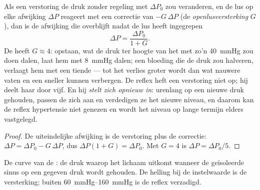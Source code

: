 \begin{theorem}\label{thm:b2:blood-pressure:gain}
Als een verstoring de druk zonder regeling met $\Delta P_0$ zou veranderen,
en de lus op elke afwijking $\Delta P$ reageert met een correctie van
$-G\,\Delta P$ (de \emph{openlusversterking} $G$), dan is de afwijking die
overblijft nadat de lus heeft ingegrepen
\[
\Delta P = \frac{\Delta P_0}{1 + G}.
\]
De  heeft $G \approx 4$: opstaan, wat de druk ter hoogte van het
 met zo'n \qty{40}{mmHg} zou doen dalen, laat hem met \qty{8}{mmHg}
dalen; een bloeding die de druk zou halveren, verlaagt hem met een tiende ---
tot het verlies groter wordt dan wat nauwere vaten en een sneller  kunnen
verbergen. De reflex heft een verstoring niet op; hij deelt haar door vijf.
En hij \emph{stelt zich opnieuw in}: urenlang op een nieuwe druk gehouden,
passen de  zich aan en verdedigen ze het nieuwe niveau, en
daarom kan de reflex hypertensie niet genezen en wordt het niveau op lange
termijn elders vastgelegd.
\end{theorem}
\begin{proof}
De uiteindelijke afwijking is de verstoring plus de correctie:
$\Delta P = \Delta P_0 - G\,\Delta P$, dus $\Delta P(1 + G) =
\Delta P_0$. Met $G = 4$ is $\Delta P = \Delta P_0/5$.
\end{proof}

\begin{omfigure}

{\small De curve van de : de druk waarop het lichaam uitkomt
wanneer de geïsoleerde sinus op een gegeven druk wordt gehouden. De helling
bij de instelwaarde is de versterking; buiten \qtyrange{60}{160}{mmHg} is de
reflex verzadigd.}
\end{omfigure}

